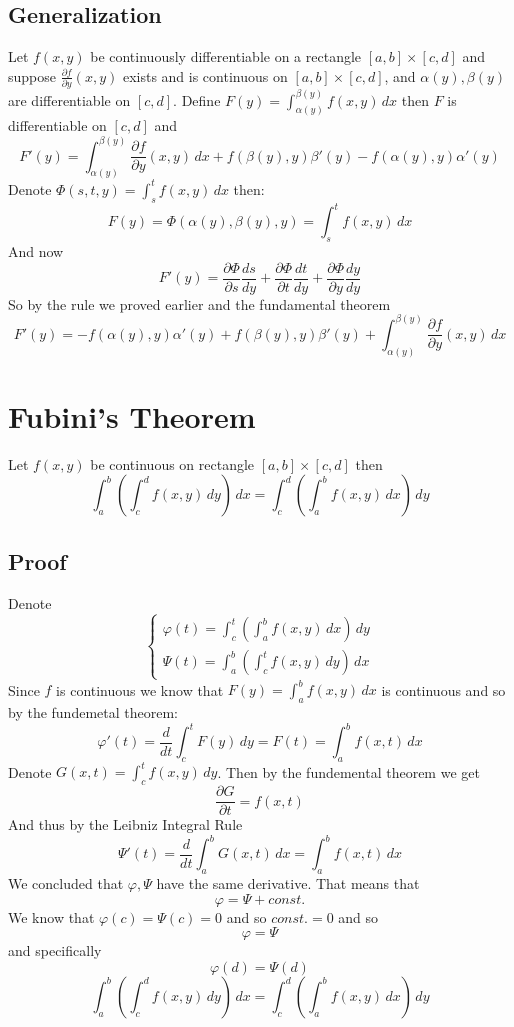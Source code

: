 \documentclass{article}
\begin{document}
	\newpage
	
	\subsection{Generalization}
	Let $f(x,y)$ be continuously differentiable on a rectangle $[a,b]\times[c,d]$ and suppose $\frac{\partial f}{\partial y}(x,y)$ exists and is continuous on $[a,b]\times[c,d]$, and $\alpha(y),\beta(y)$ are differentiable on $[c,d]$. Define $F(y) = \int_{\alpha(y)}^{\beta(y)}{f(x,y)}\,dx$ then $F$ is differentiable on $[c,d]$ and
	\[
		F'(y) = \int_{\alpha(y)}^{\beta(y)}{\frac{\partial f}{\partial y}(x,y)\, dx} + f(\beta(y),y)\beta'(y) - f(\alpha(y),y)\alpha'(y)
	\]
	Denote $\Phi(s,t,y) = \int_s^t{f(x,y)\,dx}$ then:
	\[
		F(y) = \Phi(\alpha(y),\beta(y),y) = 	\int_s^t{f(x,y)\,dx}
	\]
	And now
	\[
		F'(y) = \frac{\partial\Phi}{\partial s}\frac{ds}{dy}
	+\frac{\partial\Phi}{\partial t}\frac{dt}{dy}
	+\frac{\partial\Phi}{\partial y}\frac{dy}{dy}
	\]
	So by the rule we proved earlier and the fundamental theorem
	\[
		F'(y) = 						 -f(\alpha(y),y)\alpha'(y)
	+f(\beta(y),y)\beta'(y)
	+\int_{\alpha(y)}^{\beta(y)}{\frac{\partial f}{\partial y}(x,y)\, dx}
	\]

	\newpage
	\section{Fubini's Theorem}
	Let $f(x,y)$ be continuous on rectangle $[a,b]\times[c,d]$ then
	\[	\int_a^b\left(\int_c^d{f(x,y)\, dy}\right)\,dx
	= \int_c^d\left(\int_a^b{f(x,y)\, dx}\right)\,dy
	\]
	\subsection{Proof}
	Denote
	$$
	\begin{cases}
		\varphi(t) = \int_c^t\left(\int_a^b{f(x,y)\, dx}\right)\,dy \\
		\Psi(t) = \int_a^b\left(\int_c^t{f(x,y)\, dy}\right)\,dx
	\end{cases}
	$$
	Since $f$ is continuous we know that $F(y) = \int_a^b{f(x,y)\,dx}$ is continuous and so by the fundemetal theorem:
	\[
		\varphi'(t) = \frac{d}{dt}\int_c^t{F(y)}\,dy = F(t) = \int_a^b{f(x,t)}\,dx
	\]
	Denote $G(x,t) = \int_c^t{f(x,y)\,dy}$. Then by the fundemental theorem we get
	\[
		\frac{\partial G}{\partial t} = f(x,t)
	\]
	And thus by the Leibniz Integral Rule
	\[
		\Psi'(t) = \frac{d}{dt}\int_a^b{G(x,t)\,dx} = \int_a^b{f(x,t)\,dx}
	\]
	We concluded that $\varphi,\Psi$ have the same derivative. That means that $$\varphi = \Psi + const.$$
	We know that $\varphi(c) = \Psi(c) = 0$ and so $const.=0$ and so
	\[
		\varphi = \Psi
	\]
	and specifically
	\[
		\varphi(d) = \Psi(d)
	\]
	\[	\int_a^b\left(\int_c^d{f(x,y)\, dy}\right)\,dx
	= \int_c^d\left(\int_a^b{f(x,y)\, dx}\right)\,dy
	\]
\end{document}
